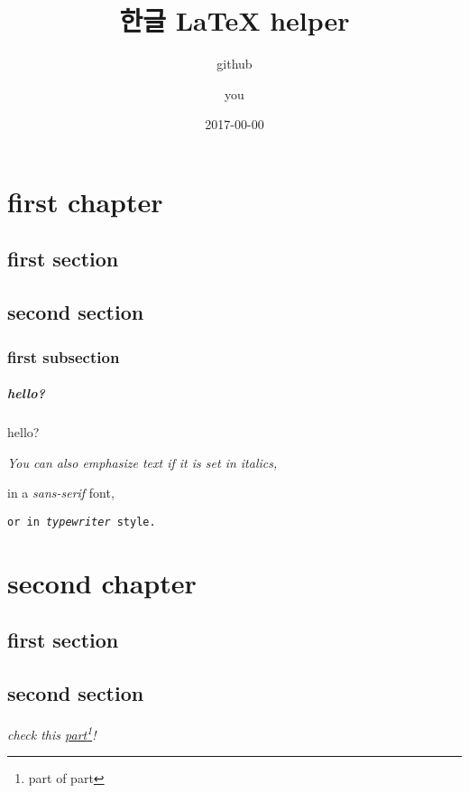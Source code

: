 \documentclass{report}
\title{한글 \LaTeX{} helper}
\author{github\and{you}}
\date{2017-00-00}
\begin{document}
\maketitle
\tableofcontents
\chapter{first chapter}
\section{first section}
\section{second section}
\subsection{first subsection}
\paragraph{hello?}

hello?\newline

\textit{You can also \emph{emphasize} text if it is set in italics,} \newline

\textsf{in a \emph{sans-serif} font,} \newline

\texttt{or in \emph{typewriter} style.}

\appendix
\chapter{second chapter}
\section{first section}
\section{second section}

\emph{check this \underline{part}\footnote{part of part}!}
\end{document}
